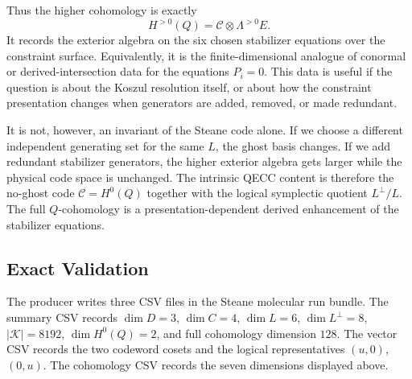 Thus the higher cohomology is exactly
\[
  H^{>0}(Q)=\mathcal C\otimes\Lambda^{>0}E.
\]
It records the exterior algebra on the six chosen stabilizer equations over the
constraint surface. Equivalently, it is the finite-dimensional analogue of
conormal or derived-intersection data for the equations \(P_i=0\). This data is
useful if the question is about the Koszul resolution itself, or about how the
constraint presentation changes when generators are added, removed, or made
redundant.

It is not, however, an invariant of the Steane code alone. If we choose a
different independent generating set for the same \(L\), the ghost basis
changes. If we add redundant stabilizer generators, the higher exterior algebra
gets larger while the physical code space is unchanged. The intrinsic QECC
content is therefore the no-ghost code \(\mathcal C=H^0(Q)\) together with the
logical symplectic quotient \(L^\perp/L\). The full \(Q\)-cohomology is a
presentation-dependent derived enhancement of the stabilizer equations.

\subsection{Exact Validation}

The producer  writes three CSV files in
the Steane molecular run bundle. The summary CSV records \(\dim D=3\),
\(\dim C=4\), \(\dim L=6\), \(\dim L^\perp=8\), \(|\mathcal K|=8192\),
\(\dim H^0(Q)=2\), and full cohomology dimension \(128\). The vector CSV
records the two codeword cosets and the logical representatives \((u,0)\),
\((0,u)\). The cohomology CSV records the seven dimensions displayed above.
